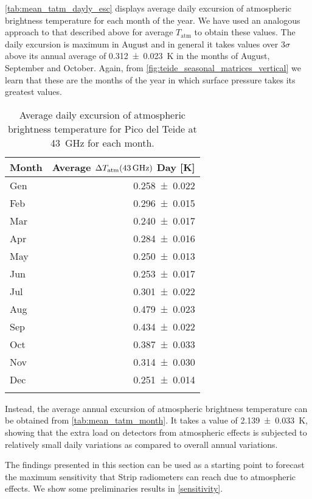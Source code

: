 \autoref{tab:mean_tatm_dayly_esc} displays average daily excursion of
atmospheric brightness temperature for each month of the year. We have used
an analogous approach to that described above for average $T_\text{atm}$ to
obtain these values. The daily excursion is maximum in August and in
general it takes values over $3\sigma$ above its annual average of
\SI{0.312 \pm 0.023}{\kelvin} in the months of August, September and
October. Again, from \autoref{fig:teide_seasonal_matrices_vertical} we
learn that these are the months of the year in which surface pressure
takes its greatest values.

\begin{table}
        \renewcommand{\arraystretch}{1.5}
        \centering
        \begin{tabular}{p{5cm} r}
                \hline
                Month & Average $\Delta
                T_\text{atm}\qty(\SI{43}{\giga\hertz})$
                Day [\si{\kelvin}] \\
                \hline
                \hline
                Gen \dotfill & \num{0.258 \pm 0.022} \\
                Feb \dotfill & \num{0.296 \pm 0.015} \\
                Mar \dotfill & \num{0.240 \pm 0.017} \\
                Apr \dotfill & \num{0.284 \pm 0.016} \\
                May \dotfill & \num{0.250 \pm 0.013} \\
                Jun \dotfill & \num{0.253 \pm 0.017} \\
                Jul \dotfill & \num{0.301 \pm 0.022} \\
                Aug \dotfill & \num{0.479 \pm 0.023} \\
                Sep \dotfill & \num{0.434 \pm 0.022} \\
                Oct \dotfill & \num{0.387 \pm 0.033} \\
                Nov \dotfill & \num{0.314 \pm 0.030} \\
                Dec \dotfill & \num{0.251 \pm 0.014} \\
                \noalign{\smallskip}
                \hline
        \end{tabular}
        \caption{Average daily excursion of atmospheric brightness
        temperature for Pico del Teide at \SI{43}{\giga\hertz} for each
        month.}
        \label{tab:mean_tatm_dayly_esc}
\end{table}

Instead, the average annual excursion of atmospheric brightness temperature
can be obtained from \autoref{tab:mean_tatm_month}. It takes a value of
\SI{2.139 \pm 0.033}{\kelvin}, showing that the extra load on detectors
from atmospheric effects is subjected to relatively small daily variations
as compared to overall annual variations.

The findings presented in this section can be used as a starting point to
forecast the maximum sensitivity that Strip radiometers can reach due to
atmospheric effects.  We show some preliminaries results in
\autoref{sensitivity}.
